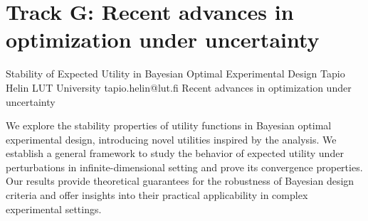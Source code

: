 \section{Track G: Recent advances in optimization under uncertainty}\newpage

\begin{talk}
  {Stability of Expected Utility in Bayesian Optimal Experimental Design}%
  {Tapio Helin}%
  {LUT University}%
  {tapio.helin@lut.fi}%
  {}%
  {Recent advances in optimization under uncertainty}%
    
   
We explore the stability properties of utility functions in Bayesian optimal experimental design, introducing novel utilities inspired by the analysis. We establish a general framework to study the behavior of expected utility under perturbations in infinite-dimensional setting and prove its convergence properties. Our results provide theoretical guarantees for the robustness of Bayesian design criteria and offer insights into their practical applicability in complex experimental settings.

\medskip

%
\end{talk}


